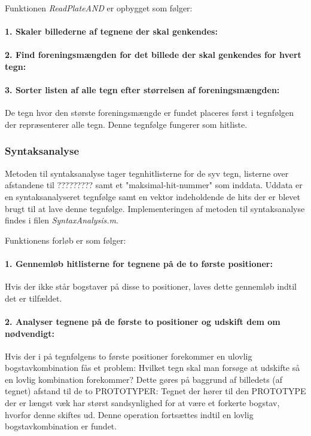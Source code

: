 Funktionen \textit{ReadPlateAND} er opbygget som følger:

\paragraph{1. Skaler billederne af tegnene der skal genkendes:}

\paragraph{2. Find foreningsmængden for det billede der skal genkendes for hvert tegn:}

\paragraph{3. Sorter listen af alle tegn efter størrelsen af foreningsmængden:} De tegn hvor den største foreningsmængde er fundet placeres først i tegnfølgen der repræsenterer alle tegn. Denne tegnfølge fungerer som hitliste.

\subsubsection{Syntaksanalyse}

Metoden til syntaksanalyse tager tegnhitlisterne for de syv tegn, listerne over afstandene til ????????? samt et "maksimal-hit-nummer" som inddata. Uddata er en syntaksanalyseret tegnfølge samt en vektor indeholdende de hits der er blevet brugt til at lave denne tegnfølge. Implementeringen af metoden til syntaksanalyse findes i filen \textit{SyntaxAnalysis.m}.

Funktionens forløb er som følger:

\paragraph{1. Gennemløb hitlisterne for tegnene på de to første positioner:} Hvis der ikke står bogstaver på disse to positioner, laves dette gennemløb indtil det er tilfældet.
\paragraph{2. Analyser tegnene på de første to positioner og udskift dem om nødvendigt:}
Hvis der i på tegnfølgens to første positioner forekommer en ulovlig bogstavkombination fås et problem: Hvilket tegn skal man forsøge at udskifte så en lovlig kombination forekommer? Dette gøres på baggrund af billedets (af tegnet) afstand til de to PROTOTYPER: Tegnet der hører til den PROTOTYPE der er længst væk har størst sandsynlighed for at være et forkerte bogstav, hvorfor denne skiftes ud. Denne operation fortsættes indtil en lovlig bogstavkombination er fundet.

